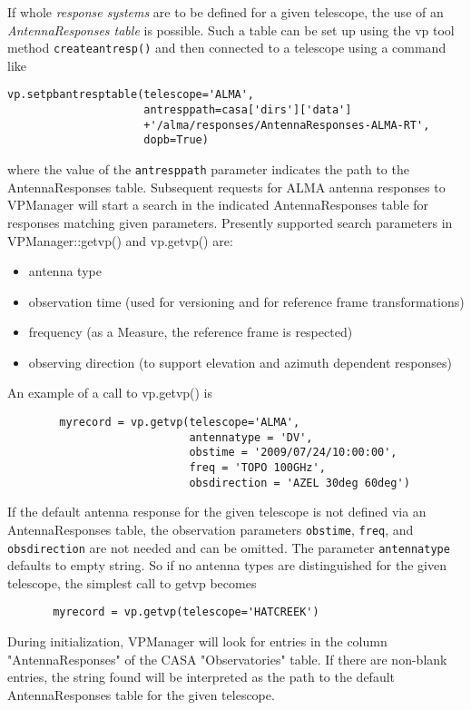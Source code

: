 \documentclass[12pt]{article}
\begin{document}
If whole {\it response systems} are to be defined for a given telescope, the use of an
{\it AntennaResponses table} is possible. Such a table can be set up using the 
vp tool method
{\tt createantresp()} 
and then connected to a telescope using a command like
\begin{verbatim}
vp.setpbantresptable(telescope='ALMA',
                     antresppath=casa['dirs']['data']
                     +'/alma/responses/AntennaResponses-ALMA-RT',
                     dopb=True)
\end{verbatim}
where the value of the {\tt antresppath} parameter indicates the path to the AntennaResponses table.
Subsequent requests for ALMA antenna responses to VPManager will start a search in the 
indicated AntennaResponses table for responses matching given parameters.
Presently supported search parameters in VPManager::getvp() and vp.getvp() are:
\begin{itemize}
\item antenna type
\item observation time (used for versioning and for reference frame transformations)
\item frequency (as a Measure, the reference frame is respected)
\item observing direction (to support elevation and azimuth dependent responses)
\end{itemize}
An example of a call to vp.getvp() is
\begin{verbatim}
        myrecord = vp.getvp(telescope='ALMA',
                            antennatype = 'DV',
                            obstime = '2009/07/24/10:00:00',
                            freq = 'TOPO 100GHz',
                            obsdirection = 'AZEL 30deg 60deg')
\end{verbatim}

If the default antenna response for the given telescope is not defined via an AntennaResponses
table, the observation parameters {\tt obstime}, {\tt freq}, and {\tt obsdirection} are not needed 
and can be omitted. The parameter {\tt antennatype} defaults to empty string. So if no antenna types
are distinguished for the given telescope, the simplest call to getvp becomes
\begin{verbatim}
       myrecord = vp.getvp(telescope='HATCREEK')
\end{verbatim}

During initialization, VPManager will look for entries in the column "AntennaResponses"
of the CASA "Observatories" table. If there are non-blank entries, the string found will be
interpreted as the path to the default AntennaResponses table for the given telescope. 
\end{document}
